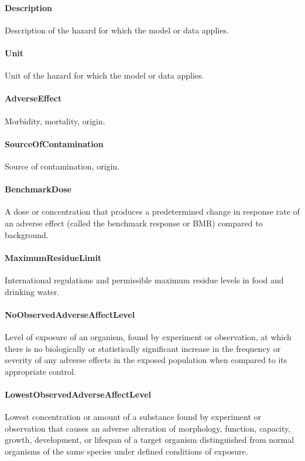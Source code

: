 \documentclass[a4paper]{report}
\begin{document}
\paragraph{Description}
Description of the hazard for which the model or data applies.

\paragraph{Unit}
Unit of the hazard for which the model or data applies.

\paragraph{AdverseEffect}
Morbidity, mortality, origin.

\paragraph{SourceOfContamination}
Source of contamination, origin.

\paragraph{BenchmarkDose}
A dose or concentration that produces a predetermined change in response rate of an adverse effect (called the benchmark response or BMR) compared to background.

\paragraph{MaximumResidueLimit}
International regulations and permissible maximum residue levels in food and drinking water.

\paragraph{NoObservedAdverseAffectLevel}
Level of exposure of an organism, found by experiment or observation, at which there is no biologically or statistically significant increase in the frequency or severity of any adverse effects in the exposed population when compared to its appropriate control.

\paragraph{LowestObservedAdverseAffectLevel}
Lowest concentration or amount of a substance found by experiment or observation that causes an adverse alteration of morphology, function, capacity, growth, development, or lifespan of a target organism distinguished from normal organisms of the same species under defined conditions of exposure.
\end{document}
